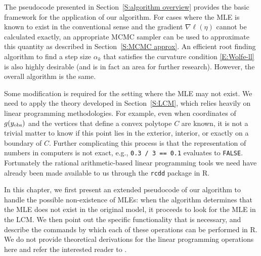 The pseudocode presented in Section~\ref{S:algorithm overview} provides the 
basic framework for the application of our algorithm.
For cases where the MLE is known to exist in the conventional sense
and  the gradient $\nabla \ell(\eta)$  
cannot be calculated exactly, an appropriate MCMC sampler can be used to 
approximate this quantity as described in Section~\ref{S:MCMC approx}.  
An efficient root finding algorithm to find a step size $\alpha_k$ that satisfies the 
curvature condition \eqref{E:Wolfe-ll} is also highly desirable (and is in fact
an area for further research).  However, the overall algorithm
is the same.

Some modification is required for the setting where the MLE may not exist.  
We need to apply the theory developed in Section~\ref{S:LCM}, which
relies heavily on linear programming methodologies.  For example, even when coordinates 
of $g(y_{\text{obs}})$ and the vertices that define a convex polytope $C$ are known, it 
is not a trivial matter to know if this point lies in the exterior, interior, 
or exactly on a boundary of $C$.  
Further complicating this process is that the representation of 
numbers in computers is not exact, e.g., \texttt{0.3 / 3 == 0.1} evaluates
to \texttt{FALSE}.  Fortunately the rational arithmetic-based linear programming
tools we need have already 
been made available to us through the \texttt{rcdd} package \citep{rcdd:R} in R.  

In this chapter, we first present an extended pseudocode of our algorithm 
to handle the possible non-existence of MLEs: when the algorithm determines that 
the MLE does not exist in the original model, it proceeds to 
look for the MLE in the LCM.  
We then point out the specific functionality that is necessary,
and describe the commands by which each of these operations can be performed in R.
We do not provide theoretical derivations for the linear programming operations here
and refer the interested reader to \citet{Fukuda:2004,Fukuda:2008}.


